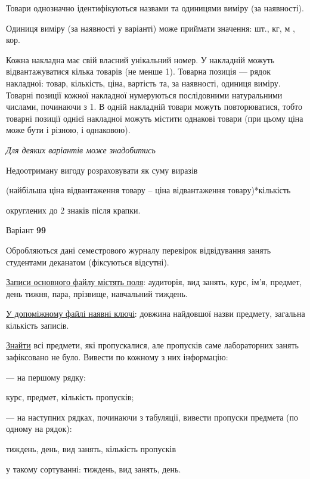 \documentclass[11pt, ukrainian]{article}
\begin{document}
Товари однозначно ідентифікуються назвами та одиницями виміру (за наявності).

Одиниця виміру (за наявності у варіанті) може приймати значення: шт., кг, м , кор.

Кожна накладна має свій власний унікальний номер.
У накладній можуть відвантажуватися кілька товарів (не менше 1).
Товарна позиція --- рядок накладної: товар, кількість, ціна, вартість та, за наявності, одиниця виміру.
Товарні позиції кожної накладної нумеруються послідовними натуральними числами, починаючи з 1.
В одній накладній товари можуть повторюватися, 
тобто товарні позиції однієї накладної можуть містити однакові товари 
(при цьому ціна може бути і різною, і однаковою).

\bigskip\textit{Для деяких варіантів може знадобитись}

Недоотриману вигоду розраховувати як суму виразів
{\center (найбільша ціна відвантаження товару – ціна відвантаження товару)*кількість\par}

\bigskip
{\noindent} округлених до 2 знаків після крапки.




\par
\newpage
{\center Варіант  \No \textbf { 99 }\par}
\bigskip
Обробляються дані семестрового журналу перевірок відвідування занять студентами деканатом (фіксуються відсутні). 

\underline{Записи основного файлу містять поля}: аудиторія, вид занять, курс, ім’я, предмет, день тижня, пара, прізвище, навчальний тиждень.

\underline{У допоміжному файлі наявні ключі}: довжина найдовшої назви предмету, загальна кількість записів.

\underline{Знайти} всі предмети, які пропускалися, але пропусків саме лабораторних занять зафіксовано не було. Вивести по кожному з них інформацію:\par
{\noindent}--- на першому рядку:\par
курс, предмет, кількість пропусків;

{\noindent}--- на наступних рядках, починаючи з табуляції, вивести пропуски предмета (по одному на рядок):\par
тиждень, день, вид занять, кількість пропусків

{\noindent}у такому сортуванні: тиждень, вид занять, день.

\end{document}
